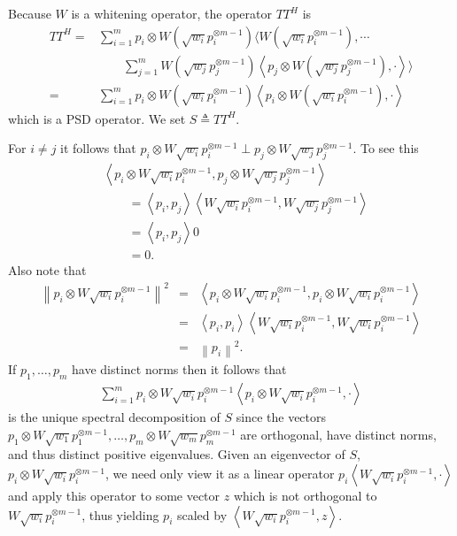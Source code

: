 \documentclass[aos,preprint]{imsart}
\def\l{\left}
\def\r{\right}
\theoremstyle{plain}
\theoremstyle{defintion}
\begin{document}
Because $W$ is a whitening operator, the operator $TT^H$ is
\begin{align*}
	TT^H =  &\sum_{i=1}^m  p_i \otimes W\l( \sqrt{w_i} p_{i}^{\otimes m-1}\r)\bigg\langle W\l(\sqrt{w_i}p_i^{\otimes m-1}\r),\cdots \\
		       &\qquad \sum_{j=1}^m   W\l( \sqrt{w_j} p_{j}^{\otimes m-1}\r)\l<p_j \otimes W\l(\sqrt{w_j}p_j^{\otimes m-1}\r),\cdot\r>\bigg\rangle \\
	=  &\sum_{i=1}^m  p_i \otimes W\l( \sqrt{w_i} p_{i}^{\otimes m-1}\r)\l<p_i \otimes W\l(\sqrt{w_i}p_i^{\otimes m-1}\r),\cdot\r> 
\end{align*}
which is a PSD operator. We set $S \triangleq TT^H$.

For $i\neq j$ it follows that $ p_i\otimes W\sqrt{w_i} p_i^{\otimes m-1} \perp  p_j\otimes W\sqrt{w_j} p_j^{\otimes m-1}$. To see this 
\begin{align*}
	&\l< p_i\otimes W \sqrt{w_i} p_i^{\otimes m-1} ,  p_j\otimes W \sqrt{w_j}p_j^{\otimes m-1}\r>\\
	&\qquad =\l<p_i,p_j\r> \l<  W \sqrt{w_i} p_i^{\otimes m-1} ,W\sqrt{w_j} p_j^{\otimes m-1}\r>\\
	       &\qquad =\l<p_i,p_j\r> 0 \\
		      &\qquad = 0.
\end{align*}
Also note that 
\begin{eqnarray*}
	\l\| p_i\otimes W \sqrt{w_i} p_i^{\otimes m-1} \r\|^2
	&=&\l< p_i\otimes W \sqrt{w_i} p_i^{\otimes m-1} ,p_i\otimes W \sqrt{w_i} p_i^{\otimes m-1} \r>\\
	&=&\l< p_i ,p_i \r>\l<W \sqrt{w_i} p_i^{\otimes m-1},W \sqrt{w_i} p_i^{\otimes m-1} \r> \\
	       &=&\l\|p_i\r\|^2.
\end{eqnarray*}
If $p_1,\ldots,p_m$ have distinct norms then it follows that 
\begin{align} \label{eqn:bigop}
    \sum_{i=1}^m  p_i\otimes W \sqrt{w_i}p_i^{\otimes m-1} \l< p_i\otimes W \sqrt{w_i}p_i^{\otimes m-1},\cdot\r>
\end{align}
is the unique spectral decomposition of $S$ since the vectors $ p_1\otimes W \sqrt{w_1}p_1^{\otimes m-1},\ldots,  p_m\otimes W \sqrt{w_m}p_m^{\otimes m-1}$ are orthogonal, have distinct norms, and thus distinct positive eigenvalues. Given an eigenvector of $S$, $p_i\otimes W \sqrt{w_i} p_i^{\otimes m-1}$, we need only view it as a linear operator $p_i\l< W \sqrt{w_i} p_i^{\otimes m-1},\cdot\r>$ and apply this operator to some vector $z$ which is not orthogonal to $W \sqrt{w_i} p_i^{\otimes m-1}$, thus yielding $p_i$ scaled by $ \l<W \sqrt{w_i} p_i^{\otimes m-1},z\r>$.
\end{document}
